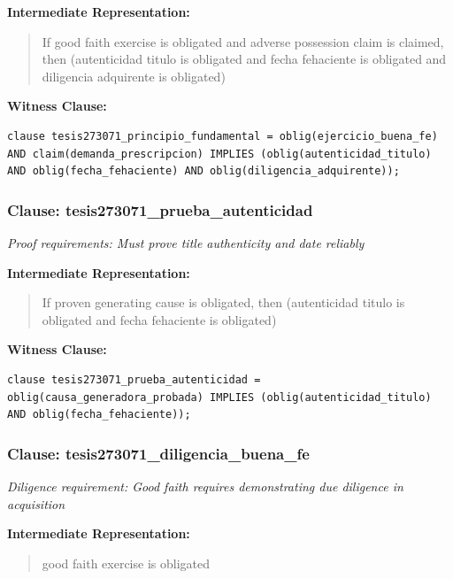 \documentclass[11pt,a4paper]{article}
\begin{document}
\textbf{Intermediate Representation:}

\begin{quote}
If good faith exercise is obligated and adverse possession claim is claimed, then (autenticidad titulo is obligated and fecha fehaciente is obligated and diligencia adquirente is obligated)
\end{quote}

\textbf{Witness Clause:}

\begin{lstlisting}[style=witnessstyle, language=Witness]
clause tesis273071_principio_fundamental = oblig(ejercicio_buena_fe) AND claim(demanda_prescripcion) IMPLIES (oblig(autenticidad_titulo) AND oblig(fecha_fehaciente) AND oblig(diligencia_adquirente));
\end{lstlisting}

\subsubsection{Clause: tesis273071\_prueba\_autenticidad}

\textit{Proof requirements: Must prove title authenticity and date reliably}

\textbf{Intermediate Representation:}

\begin{quote}
If proven generating cause is obligated, then (autenticidad titulo is obligated and fecha fehaciente is obligated)
\end{quote}

\textbf{Witness Clause:}

\begin{lstlisting}[style=witnessstyle, language=Witness]
clause tesis273071_prueba_autenticidad = oblig(causa_generadora_probada) IMPLIES (oblig(autenticidad_titulo) AND oblig(fecha_fehaciente));
\end{lstlisting}

\subsubsection{Clause: tesis273071\_diligencia\_buena\_fe}

\textit{Diligence requirement: Good faith requires demonstrating due diligence in acquisition}

\textbf{Intermediate Representation:}

\begin{quote}
good faith exercise is obligated
\end{quote}
\end{document}
